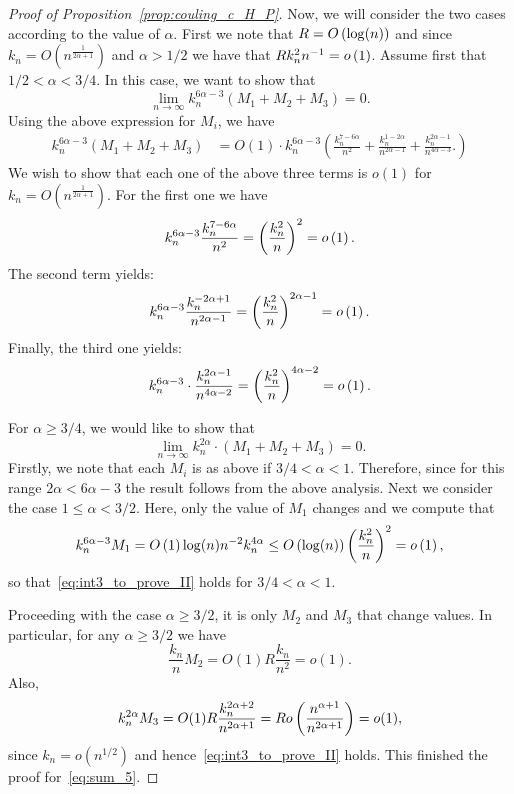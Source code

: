 \begin{proof}[Proof of Proposition~\ref{prop:couling_c_H_P}]
Now, we will consider the two cases according to the value of $\alpha$. First we note that $R = O\left(\log(n)\right)$ and since
$k_n = O(n^{\frac{1}{2\alpha +1}})$ and $\alpha > 1/2$ we have that $R k_n^2 n^{-1} = o\left(1\right)$.
Assume first that $1/2 < \alpha < 3/4$. In this case, we want to show that 
\begin{equation} \label{eq:int3_to_prove_I}
\lim_{n \to \infty} k_n^{6\alpha -3} (M_1 + M_2 + M_3) = 0. 
\end{equation}
Using the above expression for $M_i$, we have 
\begin{align*} 
 k_n^{6\alpha -3} (M_1 + M_2 + M_3) &= O(1) \cdot  
 k_n^{6\alpha -3} 
\left( 
\frac{k_n^{7-6\alpha}}{n^2} + \frac{k_n^{1-2\alpha}}{n^{2\alpha-1}} 
+\frac{k_n^{2\alpha-1}}{n^{4\alpha - 3}}.
\right) 
\end{align*}
We wish to show that each one of the above three terms is $o(1)$ for $k_n = O(n^{\frac{1}{2\alpha +1}})$. 
For the first one we have 
\[ 
	k_n^{6\alpha -3} \frac{k_n^{7-6\alpha}}{n^2} = \left(\frac{k_n^{2}}{n}\right)^2 = o\left(1\right). 
\]
The second term yields: 
\[
	k_n^{6\alpha -3}  \frac{k_n^{-2\alpha+1}}{n^{2\alpha-1}} = \left(\frac{k_n^2}{n}\right)^{2\alpha - 1} = o\left(1\right).
\]
Finally, the third one yields: 
\[
	k_n^{6\alpha -3} \cdot \frac{k_n^{2\alpha -1}}{n^{4\alpha - 2}}  
	= \left(\frac{k_n^2}{n}\right)^{4\alpha - 2} = o\left(1\right).
\]
 
For $\alpha \ge 3/4$, we would like to show that 
\begin{equation} \label{eq:int3_to_prove_II}
\lim_{n \to \infty} k_n^{2\alpha} \cdot (M_1 + M_2 + M_3) = 0. 
\end{equation}
Firstly, we note that each $M_i$ is as above if $3/4 < \alpha < 1$. Therefore, since for this range $2 \alpha <6\alpha - 3$ the result follows from the above analysis. Next we consider the case $1 \le \alpha < 3/2$. Here, only the value of $M_1$ changes and we compute that
\[
	k_n^{6\alpha - 3} M_1 = O\left(1\right) \log(n) n^{-2} k_n^{4\alpha} \le O\left(\log(n)\right) \left(\frac{k_n^2}{n}\right)^2 = o\left(1\right),
\]
so that~\eqref{eq:int3_to_prove_II} holds for $3/4 < \alpha < 1$.

Proceeding with the case $\alpha \ge 3/2$, it is only $M_2$ and $M_3$ that change values. In particular, for any $\alpha \geq 3/2$ we have 
\[
	\frac{k_n}{n}  M_2 =O(1) R \frac{k_n}{n^2} = o(1).
\]
Also,
\[
	k_n^{2\alpha }  M_3 = O(1) R \frac{k_n^{2\alpha + 2}}{n^{2\alpha + 1}}
	= R o\left(\frac{n^{\alpha + 1}}{n^{2\alpha +1}}\right) = o(1),
\]
since $k_n = o(n^{1/2})$ and hence~\eqref{eq:int3_to_prove_II} holds. This finished the proof for~\eqref{eq:sum_5}.




\end{proof}
